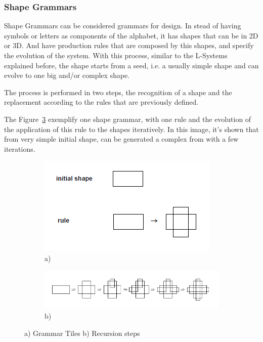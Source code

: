 
\subsubsection{Shape Grammars} %
\label{ssub:shape_grammars}


Shape Grammars can be considered grammars for design. In stead of having symbols or letters as components of the alphabet, it has shapes that can be in 2D or 3D. And have production rules that are composed by this shapes, and specify the evolution of the system. With this process, similar to the L-Systems explained before, the shape starts from a seed, i.e. a usually simple shape and can evolve to one big and/or complex shape.

The process is performed in two steps, the recognition of a shape and the replacement according to the rules that are previously defined. 

The Figure~\ref{fig:SGrammars} exemplify one shape grammar, with one rule and the evolution of the application of this rule to the shapes iteratively. In this image, it's shown that from very simple initial shape, can be generated a complex from with a few iterations.

\begin{figure}
        \centering
		\begin{subfigure}[b]{0.7\textwidth}
			\includegraphics[width=\textwidth]{img/Theory/Shape_Grammars/Grammar.png}
			\caption{a)}
			\label{fig:SGGrammar}
		\end{subfigure}
        
		\begin{subfigure}[b]{0.7\textwidth}
			\includegraphics[width=\textwidth]{img/Theory/Shape_Grammars/Recursion.png}
			\caption{b)}
			\label{fig:SGRecursion}
		\end{subfigure}
        \caption{a) Grammar Tiles b) Recursion steps}
        \label{fig:SGrammars}
\end{figure}

